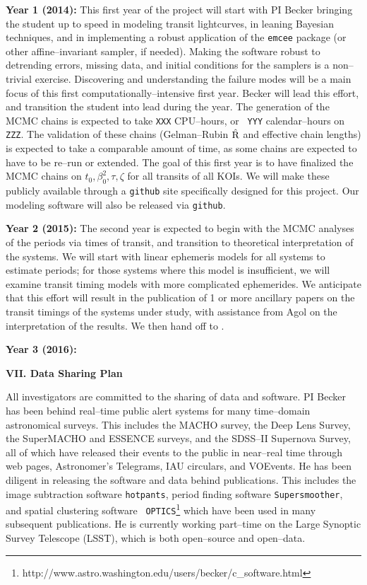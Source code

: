 {\bf Year 1 (2014):} This first year of the project will start with PI
Becker bringing the student up to speed in modeling transit
lightcurves, in leaning Bayesian techniques, and in implementing a
robust application of the {\tt emcee} package (or other
affine--invariant sampler, if needed).  Making the software robust to
detrending errors, missing data, and initial conditions for the
samplers is a non--trivial exercise.  Discovering and understanding
the failure modes will be a main focus of this first
computationally--intensive first year.  Becker will lead this effort,
and transition the student into lead during the year.  The generation
of the MCMC chains is expected to take {\tt XXX} CPU--hours, or {\tt
  YYY} calendar--hours on {\tt ZZZ}. The validation of these chains
(Gelman--Rubin $\hat{\rm R}$ and effective chain lengths) is expected
to take a comparable amount of time, as some chains are expected to
have to be re--run or extended.  The goal of this first year is to
have finalized the MCMC chains on $t_0, \beta_0^2, \tau, \zeta$ for
all transits of all KOIs.  We will make these publicly available
through a {\tt github} site specifically designed for this project.
Our modeling software will also be released via {\tt github}.

{\bf Year 2 (2015):} The second year is expected to begin with the
MCMC analyses of the periods via times of transit, and transition to
theoretical interpretation of the systems.  We will start with linear
ephemeris models for all systems to estimate periods; for those
systems where this model is insufficient, we will examine transit
timing models with more complicated ephemerides.  We anticipate that
this effort will result in the publication of 1 or more ancillary
papers on the transit timings of the systems under study, with
assistance from Agol on the interpretation of the results.  We then
hand off to .

{\bf Year 3 (2016):} 

\bigskip
\centerline{\bf VII. Data Sharing Plan}
\smallskip

All investigators are committed to the sharing of data and software.
PI Becker has been behind real--time public alert systems for many
time--domain astronomical surveys.  This includes the MACHO survey,
the Deep Lens Survey, the SuperMACHO and ESSENCE surveys, and the
SDSS--II Supernova Survey, all of which have released their events to
the public in near--real time through web pages, Astronomer's
Telegrams, IAU circulars, and VOEvents.  He has been diligent in
releasing the software and data behind publications.  This includes
the image subtraction software {\tt hotpants}, period finding software
{\tt Supersmoother}, and spatial clustering software {\tt
  OPTICS}\footnote{http://www.astro.washington.edu/users/becker/c\_software.html}
which have been used in many subsequent publications.  He is currently
working part--time on the Large Synoptic Survey Telescope (LSST),
which is both open--source and open--data.

